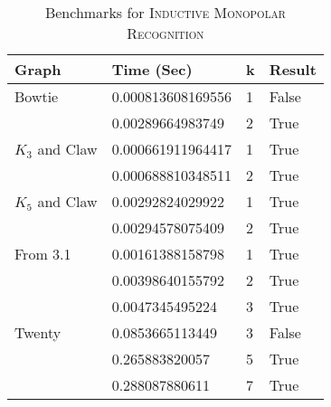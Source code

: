 \documentclass[11pt]{article}
\begin{document}
\begin{table}[ht]
\begin{center}
\begin{tabu} to 0.9\textwidth { | X[l] X[l] X[c] X[c] | }
\hline
Graph & Time (Sec) & k & Result \\
[0.5ex]
\hline
\hline
Bowtie & 0.000813608169556 & 1 & False \\
[0.3ex]
  & 0.00289664983749 & 2 & True \\
[0.3ex]
\hline
$K_3$ and Claw & 0.000661911964417 & 1 & True \\
[0.3ex]
 & 0.000688810348511 & 2 & True \\
[0.3ex]
\hline
$K_5$ and Claw & 0.00292824029922 & 1 & True \\
[0.3ex]
 & 0.00294578075409 & 2 & True \\
[0.3ex]
\hline
From 3.1 & 0.00161388158798 & 1 & True \\
[0.3ex]
 & 0.00398640155792 & 2 & True \\
[0.3ex]
 & 0.0047345495224 & 3 & True \\
[0.3ex]
\hline
Twenty & 0.0853665113449 & 3 & False \\
[0.3ex]
  & 0.265883820057 & 5 & True \\
[0.3ex]
 & 0.288087880611 & 7 & True \\
[0.3ex]
\hline
\end{tabu}
\caption{Benchmarks for \textsc{Inductive Monopolar Recognition}}
\label{table:irresults}
\end{center}
\end{table}
\end{document}
